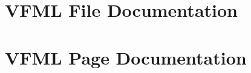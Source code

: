 \documentclass[a4paper]{book}
\begin{document}
\chapter{VFML File Documentation}














































\chapter{VFML Page Documentation}



\printindex
\end{document}
